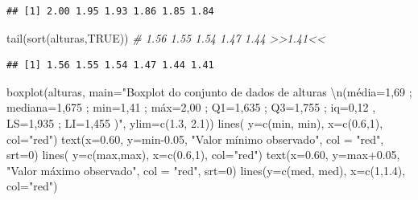 \documentclass[
]{book}
\newenvironment{Shaded}{\begin{snugshade}}{\end{snugshade}}
\newcommand{\AttributeTok}[1]{\textcolor[rgb]{0.77,0.63,0.00}{#1}}
\newcommand{\CommentTok}[1]{\textcolor[rgb]{0.56,0.35,0.01}{\textit{#1}}}
\newcommand{\ConstantTok}[1]{\textcolor[rgb]{0.00,0.00,0.00}{#1}}
\newcommand{\DecValTok}[1]{\textcolor[rgb]{0.00,0.00,0.81}{#1}}
\newcommand{\FloatTok}[1]{\textcolor[rgb]{0.00,0.00,0.81}{#1}}
\newcommand{\FunctionTok}[1]{\textcolor[rgb]{0.00,0.00,0.00}{#1}}
\newcommand{\NormalTok}[1]{#1}
\newcommand{\SpecialCharTok}[1]{\textcolor[rgb]{0.00,0.00,0.00}{#1}}
\newcommand{\StringTok}[1]{\textcolor[rgb]{0.31,0.60,0.02}{#1}}
\begin{document}
\begin{verbatim}
## [1] 2.00 1.95 1.93 1.86 1.85 1.84
\end{verbatim}

\begin{Shaded}
\begin{Highlighting}[]
\FunctionTok{tail}\NormalTok{(}\FunctionTok{sort}\NormalTok{(alturas,}\ConstantTok{TRUE}\NormalTok{)) }\CommentTok{\# 1.56 1.55 1.54 1.47 1.44 \textgreater{}\textgreater{}1.41\textless{}\textless{}}
\end{Highlighting}
\end{Shaded}

\begin{verbatim}
## [1] 1.56 1.55 1.54 1.47 1.44 1.41
\end{verbatim}

\begin{Shaded}
\begin{Highlighting}[]
\FunctionTok{boxplot}\NormalTok{(alturas, }
        \AttributeTok{main=}\StringTok{"Boxplot do conjunto de dados de alturas }\SpecialCharTok{\textbackslash{}n}\StringTok{(média=1,69 ; mediana=1,675 ; min=1,41 ; máx=2,00 ; Q1=1,635 ; Q3=1,755 ; iq=0,12 , LS=1,935  ; LI=1,455 )"}\NormalTok{,}
        \AttributeTok{ylim=}\FunctionTok{c}\NormalTok{(}\FloatTok{1.3}\NormalTok{, }\FloatTok{2.1}\NormalTok{))}
\FunctionTok{lines}\NormalTok{( }\AttributeTok{y=}\FunctionTok{c}\NormalTok{(min, min), }\AttributeTok{x=}\FunctionTok{c}\NormalTok{(}\FloatTok{0.6}\NormalTok{,}\DecValTok{1}\NormalTok{), }\AttributeTok{col=}\StringTok{"red"}\NormalTok{) }
\FunctionTok{text}\NormalTok{(}\AttributeTok{x=}\FloatTok{0.60}\NormalTok{, }\AttributeTok{y=}\NormalTok{min}\FloatTok{{-}0.05}\NormalTok{, }\StringTok{"Valor mínimo observado"}\NormalTok{, }\AttributeTok{col =} \StringTok{"red"}\NormalTok{, }\AttributeTok{srt=}\DecValTok{0}\NormalTok{)}
\FunctionTok{lines}\NormalTok{( }\AttributeTok{y=}\FunctionTok{c}\NormalTok{(max,max), }\AttributeTok{x=}\FunctionTok{c}\NormalTok{(}\FloatTok{0.6}\NormalTok{,}\DecValTok{1}\NormalTok{), }\AttributeTok{col=}\StringTok{"red"}\NormalTok{) }
\FunctionTok{text}\NormalTok{(}\AttributeTok{x=}\FloatTok{0.60}\NormalTok{, }\AttributeTok{y=}\NormalTok{max}\FloatTok{+0.05}\NormalTok{, }\StringTok{"Valor máximo observado"}\NormalTok{, }\AttributeTok{col =} \StringTok{"red"}\NormalTok{, }\AttributeTok{srt=}\DecValTok{0}\NormalTok{)}
\FunctionTok{lines}\NormalTok{(}\AttributeTok{y=}\FunctionTok{c}\NormalTok{(med, med),  }\AttributeTok{x=}\FunctionTok{c}\NormalTok{(}\DecValTok{1}\NormalTok{,}\FloatTok{1.4}\NormalTok{), }\AttributeTok{col=}\StringTok{"red"}\NormalTok{) }

\end{Highlighting}
\end{Shaded}
\end{document}
